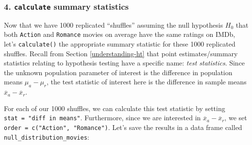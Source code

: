 \documentclass[
]{book}
\newenvironment{Shaded}{\begin{snugshade}}{\end{snugshade}}
\newcommand{\DataTypeTok}[1]{\textcolor[rgb]{0.13,0.29,0.53}{#1}}
\newcommand{\DecValTok}[1]{\textcolor[rgb]{0.00,0.00,0.81}{#1}}
\newcommand{\KeywordTok}[1]{\textcolor[rgb]{0.13,0.29,0.53}{\textbf{#1}}}
\newcommand{\NormalTok}[1]{#1}
\newcommand{\OperatorTok}[1]{\textcolor[rgb]{0.81,0.36,0.00}{\textbf{#1}}}
\newcommand{\StringTok}[1]{\textcolor[rgb]{0.31,0.60,0.02}{#1}}
\begin{document}
\hypertarget{calculate-summary-statistics-1}{%
\subsubsection*{\texorpdfstring{4. \texttt{calculate} summary statistics}{4. calculate summary statistics}}\label{calculate-summary-statistics-1}}

Now that we have 1000 replicated ``shuffles'' assuming the null hypothesis \(H_0\) that both \texttt{Action} and \texttt{Romance} movies on average have the same ratings on IMDb, let's \texttt{calculate()} the appropriate summary statistic for these 1000 replicated shuffles. Recall from Section \ref{understanding-ht} that point estimates/summary statistics relating to hypothesis testing have a specific name: \emph{test statistics}. Since the unknown population parameter of interest is the difference in population means \(\mu_{a} - \mu_{r}\), the test statistic of interest here is the difference in sample means \(\overline{x}_{a} - \overline{x}_{r}\).

For each of our 1000 shuffles, we can calculate this test statistic by setting \texttt{stat\ =\ "diff\ in\ means"}. Furthermore, since we are interested in \(\overline{x}_{a} - \overline{x}_{r}\), we set \texttt{order\ =\ c("Action",\ "Romance")}. Let's save the results in a data frame called \texttt{null\_distribution\_movies}:

\begin{Shaded}
\end{Shaded}
\end{document}
